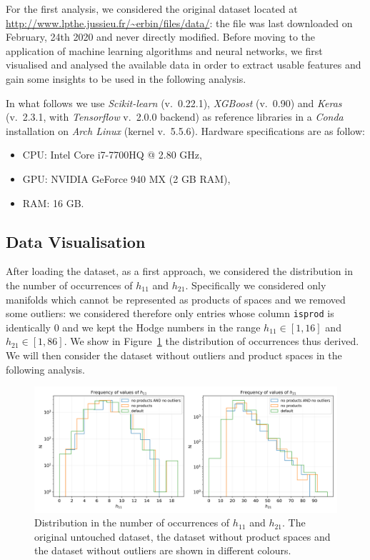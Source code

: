 For the first analysis, we considered the original dataset located at \url{http://www.lpthe.jussieu.fr/~erbin/files/data/}: the file was last downloaded on February, 24th 2020 and never directly modified. Before moving to the application of machine learning algorithms and neural networks, we first visualised and analysed the available data in order to extract usable features and gain some insights to be used in the following analysis.

In what follows we use \textit{Scikit-learn} (v.\ 0.22.1), \textit{XGBoost} (v.\ 0.90) and \textit{Keras} (v.\ 2.3.1, with \textit{Tensorflow} v.\ 2.0.0 backend) as reference libraries in a \textit{Conda} installation on \textit{Arch Linux} (kernel v.\ 5.5.6). Hardware specifications are as follow:
\begin{itemize}
    \item CPU: Intel Core i7-7700HQ @ 2.80 GHz,
    \item GPU: NVIDIA GeForce 940 MX (2 GB RAM),
    \item RAM: 16 GB.
\end{itemize}

\subsection{Data Visualisation}

    After loading the dataset, as a first approach, we considered the distribution in the number of occurrences of $h_{11}$ and $h_{21}$. Specifically we considered only manifolds which cannot be represented as products of spaces and we removed some outliers: we considered therefore only entries whose column \texttt{isprod} is identically $0$ and we kept the Hodge numbers in the range $h_{11} \in \left[ 1, 16 \right]$ and $h_{21} \in \left[1, 86 \right]$. We show in Figure~\ref{fig:distribution_occurrences} the distribution of occurrences thus derived. We will then consider the dataset without outliers and product spaces in the following analysis.
    
    \begin{figure}[!t]
        \centering
        \includegraphics[width=\textwidth]{tex/img/h11_h21_occurrencies.png}
        \caption{Distribution in the number of occurrences of $h_{11}$ and $h_{21}$. The original untouched dataset, the dataset without product spaces and the dataset without outliers are shown in different colours.}
        \label{fig:distribution_occurrences}
    \end{figure}
    
